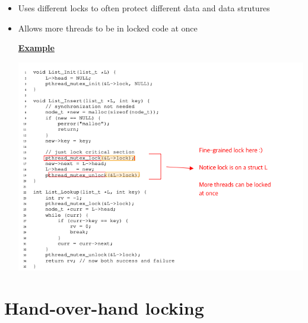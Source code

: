 \documentclass[12pt]{article}
\begin{document}
\begin{itemize}
    \item Uses different locks to often protect different data and data strutures
    \item Allows more threads to be in locked code at once

    \bigskip

    \underline{\textbf{Example}}

    \bigskip

    \begin{center}
    \includegraphics[width=\linewidth]{../images/midterm_3_solution_11.png}
    \end{center}

\end{itemize}
\section{Hand-over-hand locking}
\end{document}

